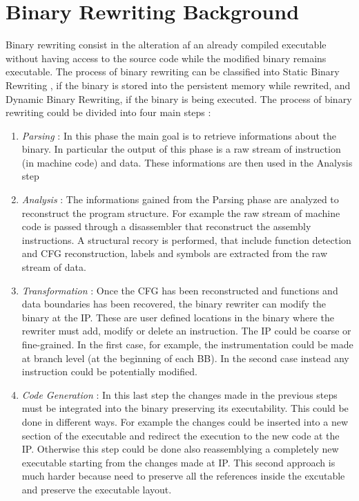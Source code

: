 \section{Binary Rewriting Background}\label{sec:biniary_rewriting}
        Binary rewriting consist in the alteration af an already compiled executable without having access to the source code 
        while the modified binary remains executable. 
        The process of binary rewriting can be classified into Static Binary Rewriting , if the binary is stored into the 
        persistent memory while rewrited, and Dynamic Binary Rewriting, if the binary is being executed.
        The process of binary rewriting could be divided into four main steps \cite{binaryrewriting}:
        \begin{enumerate}
            \item \textit{Parsing} : In this phase the main goal is to retrieve informations about the binary. 
                In particular the output of this phase is a raw stream of instruction (in machine code) and data.
                These informations are then used in the Analysis step

            \item \textit{Analysis} : The informations gained from the Parsing phase are analyzed to reconstruct the program structure.
            For example the raw stream of machine code is passed through a disassembler that reconstruct the 
            assembly instructions. A structural recory is performed, that include function detection and \gls{CFG} reconstruction, 
            labels and symbols are extracted from the raw stream of data.

            \item \textit{Transformation} : Once the \gls{CFG} has been reconstructed and functions and data boundaries has been recovered, 
                the binary rewriter can modify the binary at the \gls{IP}. These are user defined locations in the binary where 
                the rewriter must add, modify or delete an instruction. The \gls{IP} could be coarse or fine-grained.
                In the first case, for example, the instrumentation could be made at branch level (at the beginning of each \gls{BB}).
                In the second case instead any instruction could be potentially modified.
            
            \item \textit{Code Generation} : In this last step the changes made in the previous steps must be integrated into the 
                binary preserving its executability. This could be done in different ways. For example the changes could be 
                inserted into a new section of the executable and redirect the execution to the new code at the \gls{IP}.
                Otherwise this step could be done also reassemblying a completely new executable starting from the 
                changes made at \gls{IP}. This second approach is much harder because need to preserve all the 
                references inside the excutable and preserve the executable layout.
        \end{enumerate} 
